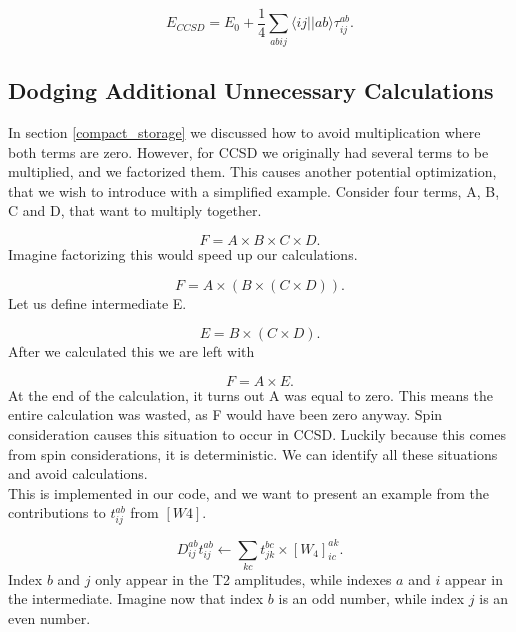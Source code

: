 \begin{equation}
E_{CCSD} = E_0 + \frac{1}{4} \sum_{abij} \langle ij || ab \rangle \tau_{ij}^{ab} .
\end{equation}

\subsection{Dodging Additional Unnecessary Calculations}
In section \ref{compact_storage} we discussed how to avoid multiplication where both terms are zero. However, for CCSD we originally had several terms to be multiplied, and we factorized them. This causes another potential optimization, that we wish to introduce with a simplified example. Consider four terms, A, B, C and D, that want to multiply together.

\begin{equation}
F = A \times B \times C \times D .
\end{equation}
Imagine factorizing this would speed up our calculations.

\begin{equation}
F = A \times (B \times (C \times D ) ) .
\end{equation}
Let us define intermediate E.

\begin{equation}
E = B \times (C \times D ) .
\end{equation}
After we calculated this we are left with

\begin{equation}
F = A \times E .
\end{equation}
At the end of the calculation, it turns out A was equal to zero. This means the entire calculation was wasted, as F would have been zero anyway. Spin consideration causes this situation to occur in CCSD. Luckily because this comes from spin considerations, it is deterministic. We can identify all these situations and avoid calculations. \\

This is implemented in our code, and we want to present an example from the contributions to $t_{ij}^{ab}$ from $[W4]$.

\begin{equation}
D_{ij}^{ab} t_{ij}^{ab} \leftarrow \sum_{kc} t_{jk}^{bc} \times [W_4]_{ic}^{ak} .
\end{equation}
Index $b$ and $j$ only appear in the T2 amplitudes, while indexes $a$ and $i$ appear in the intermediate. Imagine now that index $b$ is an odd number, while index $j$ is an even number. \\


